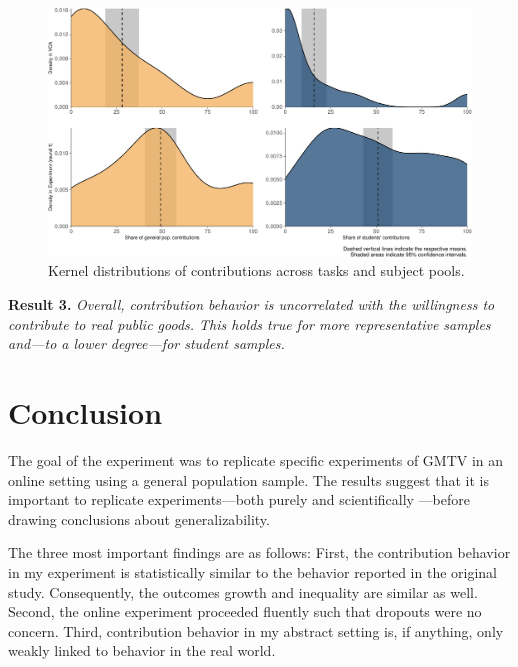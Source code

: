 \documentclass[
  authoryear,
  preprint,
  3p]{elsarticle}
\begin{document}
\begin{figure}

{\centering \includegraphics{paper_files/figure-pdf/fig-kernel-generalizability-1.pdf}

}

\caption{\label{fig-kernel-generalizability}Kernel distributions of
contributions across tasks and subject pools.}

\end{figure}

\textbf{Result 3.} \emph{Overall, contribution behavior is uncorrelated
with the willingness to contribute to real public goods. This holds true
for more representative samples and---to a lower degree---for student
samples.}

\hypertarget{sec-conclusion}{%
\section{Conclusion}\label{sec-conclusion}}

The goal of the experiment was to replicate specific experiments of GMTV
in an online setting using a general population sample. The results
suggest that it is important to replicate experiments---both purely and
scientifically \citep[ p.~716]{Hamermesh2007}---before drawing
conclusions about generalizability.

The three most important findings are as follows: First, the
contribution behavior in my experiment is statistically similar to the
behavior reported in the original study. Consequently, the outcomes
growth and inequality are similar as well. Second, the online experiment
proceeded fluently such that dropouts were no concern. Third,
contribution behavior in my abstract setting is, if anything, only
weakly linked to behavior in the real world.
\end{document}
